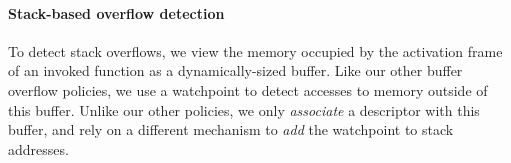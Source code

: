 \documentclass[letterpaper,twocolumn,10pt]{article}
\newcommand{\comment}[1]{}
\begin{document}




\paragraph{Stack-based overflow detection}

To detect stack overflows, we view the memory occupied by the activation frame of an invoked function as a dynamically-sized buffer. Like our other buffer overflow policies, we use a watchpoint to detect accesses to memory outside of this buffer. Unlike our other policies, we only \emph{associate} a descriptor with this buffer, and rely on a different mechanism to \emph{add} the watchpoint to stack addresses.
\end{document}
